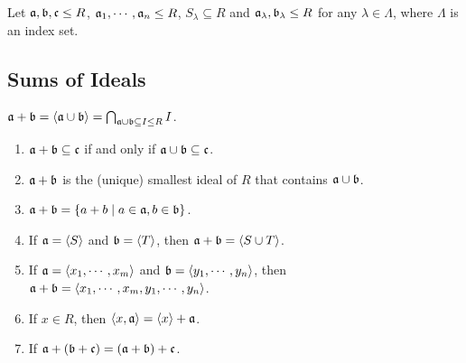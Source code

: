 Let $\mathfrak{a},\mathfrak{b},\mathfrak{c} \leq R$, $\mathfrak{a}_1,\cdots,\mathfrak{a}_n \leq R$, $S_\lambda \subseteq R$ and $\mathfrak{a}_\lambda,\mathfrak{b}_\lambda \leq R$ for any $\lambda \in \Lambda$, where $\Lambda$ is an index set.

\subsection*{Sums of Ideals}

\begin{definition}
    $\mathfrak{a} + \mathfrak{b} = \langle \mathfrak{a} \cup \mathfrak{b} \rangle = \bigcap_{\mathfrak{a} \cup \mathfrak{b} \subseteq I \leq R}I$.
\end{definition}

\begin{fact}
    \begin{enumerate}
        \item $\mathfrak{a} + \mathfrak{b} \subseteq \mathfrak{c}$ if and only if $\mathfrak{a} \cup \mathfrak{b} \subseteq \mathfrak{c}$.
        \item $\mathfrak{a} + \mathfrak{b}$ is the (unique) smallest ideal of $R$ that contains $\mathfrak{a} \cup \mathfrak{b}$.
        \item $\mathfrak{a} + \mathfrak{b} = \{a + b \mid a \in \mathfrak{a}, b \in \mathfrak{b}\}$.
        \item If $\mathfrak{a} = \langle S \rangle$ and $\mathfrak{b} = \langle T \rangle$, then $\mathfrak{a} + \mathfrak{b} = \langle S \cup T \rangle$.
        \item If $\mathfrak{a} = \langle x_1,\cdots,x_m \rangle$ and $\mathfrak{b} = \langle y_1,\cdots,y_n \rangle$, then $\mathfrak{a} + \mathfrak{b} = \langle x_1,\cdots,x_m, y_1,\cdots,y_n \rangle$.
        \item If $x \in R$, then $\langle x,\mathfrak{a} \rangle = \langle x \rangle + \mathfrak{a}$.
        \item If $\mathfrak{a} + (\mathfrak{b} + \mathfrak{c}) = (\mathfrak{a} + \mathfrak{b}) + \mathfrak{c}$.
    \end{enumerate}
\end{fact}

